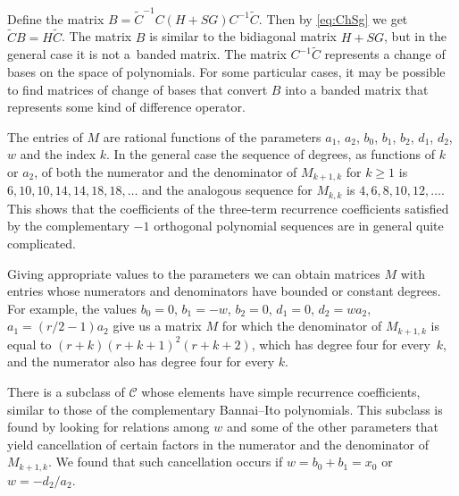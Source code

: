 \documentclass[10pt,a4paper]{amsart}
\def\cC{\mathcal C}
\numberwithin{equation}{section}
\begin{document}
Define the matrix
$%
	B={\tilde C}^{-1} C (H+S G)C^{-1} \tilde C$.
Then by \eqref{eq:ChSg} we get
$
	\tilde C B = H \tilde C$.
The matrix $B$ is similar to the bidiagonal matrix $H+ S G$, but in the general case it is not a~banded matrix. The matrix $C^{-1} \tilde C$ represents a change of bases on the space of polynomials. For some particular cases, it may be possible to find matrices of change of bases that convert $B$ into a banded matrix that represents some kind of difference operator.

The entries of $M$ are rational functions of the parameters $a_1$, $a_2$, $b_0$, $b_1$, $b_2$, $d_1$, $d_2$, $w$ and the index $k$. In the general case the sequence of degrees, as functions of $k$ or $a_2$, of both the numerator and the denominator of $M_{k+1,k} $ for $k\ge 1 $ is $6,10,10,14,14,18,18,\dots $ and the analogous sequence for $M_{k,k}$ is $ 4,6,8,10,12,\dots$. This shows that the coefficients of the three-term recurrence coefficients satisfied by the complementary $-1$ orthogonal polynomial sequences are in general quite complicated.

Giving appropriate values to the parameters we can obtain matrices $M$ with entries whose numerators and denominators have bounded or constant degrees. For example, the values ${b_0=0}$, $b_1=-w$, $b_2=0$, $d_1=0$, $d_2=w a_2$, $a_1=(r/2 -1)a_2$ give us a matrix $M$ for which the denominator of $M_{k+1,k}$ is equal to $(r+k)(r+k+1)^2 (r+k+2)$, which has degree four for every~$k$, and the numerator also has degree four for every $k$.


There is a subclass of $\cC$ whose elements have simple recurrence coefficients, similar to those of the complementary Bannai--Ito polynomials.
This subclass is found by looking for relations among $w$ and some of the other parameters that yield cancellation of certain factors in the numerator and the denominator of $M_{k+1,k}$. We found that such cancellation occurs if ${w=b_0+b_1=x_0}$ or $w=-d_2/a_2$.
\end{document}
